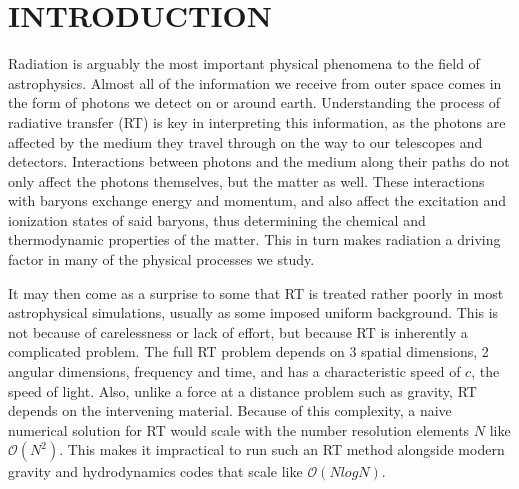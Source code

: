 \documentclass[fleqn,usenatbib]{mnras}
\begin{document}
\section{INTRODUCTION}\label{sec:intro}

Radiation is arguably the most important physical phenomena to the field of
astrophysics. Almost all of the information we receive from outer space comes 
in the form of photons we detect on or around earth. Understanding the process 
of radiative transfer (RT) is key in interpreting this information, as the 
photons are affected by the medium they travel through on the way to our 
telescopes and detectors. Interactions between photons and the medium along
 their paths do not only affect the photons themselves, but the matter as well.
 These interactions with baryons exchange energy and momentum, and also affect
 the excitation and ionization states of said baryons, thus determining the 
chemical and thermodynamic properties of the matter. This in turn makes 
radiation a driving factor in many of the physical processes we study.

It may then come as a surprise to some that RT is treated rather poorly in most
 astrophysical simulations, usually as some imposed uniform background. This is
 not because of carelessness or lack of effort, but because RT is inherently a 
complicated problem. The full RT problem depends on 3 spatial dimensions, 2 
angular dimensions, frequency and time, and has a characteristic speed of $c$, 
the speed of light. Also, unlike a force at a distance problem such as gravity,
 RT depends on the intervening material. Because of this complexity, a naive 
numerical solution for RT would scale with the number resolution elements $N$ 
like $\mathcal{O}(N^2)$. This makes it impractical to run such an RT method 
alongside modern gravity and hydrodynamics codes that scale like 
$\mathcal{O}(NlogN)$.
\end{document}
